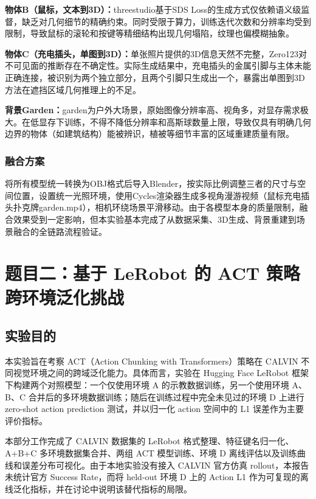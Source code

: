 \documentclass[12pt,a4paper]{ctexart}
\begin{document}
\textbf{物体B（鼠标，文本到3D）：}threestudio基于SDS Loss的生成方式仅依赖语义级监督，缺乏对几何细节的精确约束。同时受限于算力，训练迭代次数和分辨率均受到限制，导致鼠标的滚轮和按键等精细结构出现几何塌陷，纹理也偏模糊抽象。

\textbf{物体C（充电插头，单图到3D）：}单张照片提供的3D信息天然不完整，Zero123对不可见面的推断存在不确定性。实际生成结果中，充电插头的金属引脚与主体未能正确连接，被识别为两个独立部分，且两个引脚只生成出一个，暴露出单图到3D方法在遮挡区域几何推理上的不足。

\textbf{背景Garden：}garden为户外大场景，原始图像分辨率高、视角多，对显存需求极大。在低显存下训练，不得不降低分辨率和高斯球数量上限，导致仅具有明确几何边界的物体（如建筑结构）能被辨识，植被等细节丰富的区域重建质量有限。

\subsubsection{融合方案}

将所有模型统一转换为OBJ格式后导入Blender，按实际比例调整三者的尺寸与空间位置，设置统一光照环境，使用Cycles渲染器生成多视角漫游视频（鼠标充电插头扑克牌garden.mp4），相机环绕场景平滑移动。由于各模型本身的质量限制，融合效果受到一定影响，但本实验基本完成了从数据采集、3D生成、背景重建到场景融合的全链路流程验证。

\clearpage
\section{题目二：基于 LeRobot 的 ACT 策略跨环境泛化挑战}

\subsection{实验目的}

本实验旨在考察 ACT（Action Chunking with Transformers）策略在 CALVIN 不同视觉环境之间的跨域泛化能力。具体而言，实验在 Hugging Face LeRobot 框架下构建两个对照模型：一个仅使用环境 A 的示教数据训练，另一个使用环境 A、B、C 合并后的多环境数据训练；随后在训练过程中完全未见过的环境 D 上进行 zero-shot action prediction 测试，并以归一化 action 空间中的 L1 误差作为主要评价指标。

本部分工作完成了 CALVIN 数据集的 LeRobot 格式整理、特征键名归一化、A+B+C 多环境数据集合并、两组 ACT 模型训练、环境 D 离线评估以及训练曲线和误差分布可视化。由于本地实验没有接入 CALVIN 官方仿真 rollout，本报告未统计官方 Success Rate，而将 held-out 环境 D 上的 Action L1 作为可复现的离线泛化指标，并在讨论中说明该替代指标的局限。
\end{document}
